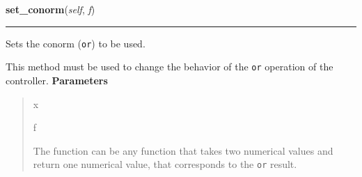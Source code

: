     \label{peach:fuzzy:control:Controller:set_conorm}

    \vspace{0.5ex}

\hspace{.8\funcindent}\begin{boxedminipage}{\funcwidth}

    \raggedright \textbf{set\_conorm}(\textit{self}, \textit{f})

    \vspace{-1.5ex}

    \rule{\textwidth}{0.5\fboxrule}
\setlength{\parskip}{2ex}

Sets the conorm (\texttt{or}) to be used.

This method must be used to change the behavior of the \texttt{or} operation
of the controller.
\setlength{\parskip}{1ex}
      \textbf{Parameters}
      \vspace{-1ex}

      \begin{quote}
        \begin{Ventry}{x}

          \item[f]


The function can be any function that takes two numerical values and
return one numerical value, that corresponds to the \texttt{or} result.
        \end{Ventry}

      \end{quote}

    \end{boxedminipage}

    \label{peach:fuzzy:control:Controller:set_negation}

    \vspace{0.5ex}

